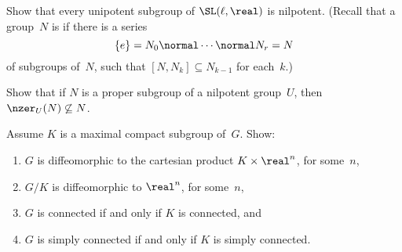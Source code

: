 \begin{exercises}
\item \label{UnipNilp}
Show that every unipotent subgroup of $\SL(\ell,\real)$ is nilpotent.
(Recall that a group~$N$ is  if there is a series 
	$$\{e\} = N_0 \normal \cdots \normal N_r = N$$
of subgroups of~$N$, such that $[N, N_k] \subseteq N_{k-1}$ for each~$k$.)

\item \label{NilpNorm}
Show that if $N$ is a proper subgroup of a nilpotent group~$U$, then $\nzer_U(N) \not\subseteq N$.

\item  \label{G=KxRn}
Assume $K$ is a maximal compact subgroup of~$G$. Show:
	\noprelistbreak
	\begin{enumerate}
	\item $G$ is diffeomorphic to the cartesian product $K \times \real^n$, for
some~$n$,
	\item \label{G=KxRn-G/K}
	$G/K$ is diffeomorphic to $\real^n$, for some~$n$,
	\item $G$ is connected if and only if $K$ is connected,
	and 
	\item $G$ is simply connected if and only if $K$ is simply connected.
	\end{enumerate}


\end{exercises}



